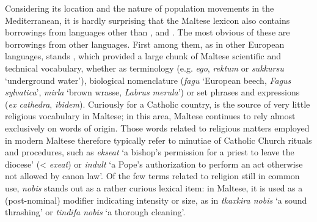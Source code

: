 \documentclass[output=paper]{langsci/langscibook}
\begin{document}
Considering its location and the nature of population movements in the Mediterranean, it is hardly surprising that the Maltese lexicon also contains borrowings from languages other than ,  and . %
The most obvious of these are borrowings from other  languages. First among them, as in other European languages, stands , which provided a large chunk of Maltese scientific and technical vocabulary, whether as terminology (e.g. \textit{ego},  \textit{rektum} or  \textit{sukkursu} `underground water'), biological nomenclature (\textit{fagu} `European beech, \textit{Fagus sylvatica}', \textit{mirla} `brown wrasse, \textit{Labrus merula}') or set phrases and expressions (\textit{ex cathedra}, \textit{ibidem}). Curiously for a Catholic country,  is the source of very little religious vocabulary in Maltese; in this area, Maltese continues to rely almost exclusively on words of  origin. Those  words related to religious matters employed in modern Maltese therefore typically refer to minutiae of Catholic Church rituals and procedures, such as \textit{ekseat} `a bishop's permission for a priest to leave the diocese' (< \textit{exeat}) or \textit{indult} `a Pope's authorization to perform an act otherwise not allowed by canon law'. Of the few  terms related to religion still in common use, \textit{nobis} stands out as a rather curious lexical item: in Maltese, it is used as a (post-nominal) modifier indicating intensity or size, as in \textit{tkaxkira nobis} `a sound thrashing' or \textit{tindifa nobis} `a thorough cleaning'.
\end{document}
